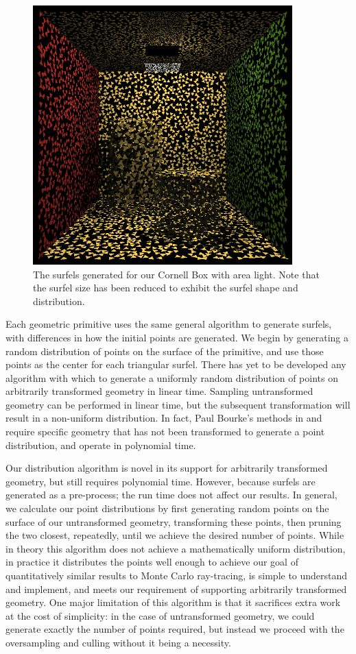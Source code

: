 \begin{figure}[h!]
   \centering
   \includegraphics[width=100mm]{../img/cornell_simp_area_surfelcloud.png}
   \captionfonts
   \caption[Cornell Box with area light surfels]{The surfels generated for our Cornell Box with area light. Note that the surfel size has been reduced to exhibit the surfel shape and distribution.}
   \label{fig:surfelcloud}
\end{figure}

Each geometric primitive uses the same general algorithm to generate surfels, with differences in how the initial points are generated. We begin by generating a random distribution of points on the surface of the primitive, and use those points as the center for each triangular surfel. There has yet to be developed any algorithm with which to generate a uniformly random distribution of points on arbitrarily transformed geometry in linear time. Sampling untransformed geometry can be performed in linear time, but the subsequent transformation will result in a non-uniform distribution. In fact, Paul Bourke's methods in \cite{bib:bourke_pointdist} and \cite{bib:bourke_spheregen} require specific geometry that has not been transformed to generate a point distribution, and operate in polynomial time.

Our distribution algorithm is novel in its support for arbitrarily transformed geometry, but still requires polynomial time. However, because surfels are generated as a pre-process; the run time does not affect our results. In general, we calculate our point distributions by first generating random points on the surface of our untransformed geometry, transforming these points, then pruning the two closest, repeatedly, until we achieve the desired number of points. While in theory this algorithm does not achieve a mathematically uniform distribution, in practice it distributes the points well enough to achieve our goal of quantitatively similar results to Monte Carlo ray-tracing, is simple to understand and implement, and meets our requirement of supporting arbitrarily transformed geometry. One major limitation of this algorithm is that it sacrifices extra work at the cost of simplicity: in the case of untransformed geometry, we could generate exactly the number of points required, but instead we proceed with the oversampling and culling without it being a necessity.

